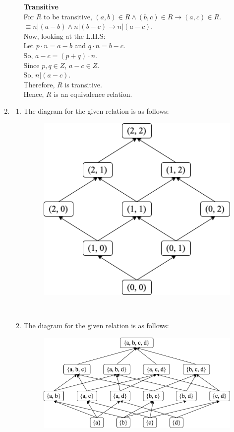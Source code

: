 \documentclass[a4paper]{article}
\begin{document}
\begin{enumerate}
\begin{enumerate}
        \textbf{Transitive}\\
        For $R$ to be transitive, $(a, b) \in R \land (b, c) \in R \rightarrow (a, c) \in R$.\\
        $\equiv n|(a - b) \land n|(b - c) \rightarrow n|(a - c)$.\\
        
        Now, looking at the L.H.S:\\
        Let $p \cdot n = a - b$ and $q \cdot n = b - c$.\\
        So, $a - c = (p + q) \cdot n$.\\
        Since $p, q \in Z$, $a - c \in Z$.\\
        So, $n|(a - c)$.\\

        Therefore, $R$ is transitive.\\

        Hence, $R$ is an equivalence relation.\\
    \end{enumerate}

    \newpage
    \item \begin{enumerate}
        \item The diagram for the given relation is as follows:
        \begin{figure}[ht]
            \centering
            \includegraphics[width=0.35\linewidth]{"DM A3P2 Diagram 1.png"}
        \end{figure} \\

        \item The diagram for the given relation is as follows:
        \begin{figure}[ht]
            \centering
            \includegraphics[width=0.6\linewidth]{"DM A3P2 Diagram 2.png"}
        \end{figure}
    \end{enumerate}


\end{enumerate}
\end{document}
